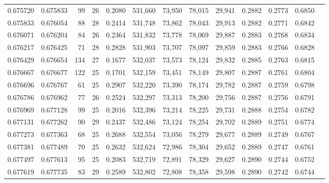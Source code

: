 \begin{tabular}{rrrrrrrrrrrrr}
0.675720 & 0.675833 &     99 &    26 &                                     0.2080 & 531,660 &  73,950 &  78,015 &  29,941 & 0.2882 & 0.2773 & 0.6850 \\
0.675833 & 0.676054 &     88 &    28 &                                     0.2414 & 531,748 &  73,862 &  78,043 &  29,913 & 0.2882 & 0.2771 & 0.6842 \\
0.676071 & 0.676204 &     84 &    26 &                                     0.2364 & 531,832 &  73,778 &  78,069 &  29,887 & 0.2883 & 0.2768 & 0.6834 \\
0.676217 & 0.676425 &     71 &    28 &                                     0.2828 & 531,903 &  73,707 &  78,097 &  29,859 & 0.2883 & 0.2766 & 0.6828 \\
0.676429 & 0.676654 &    134 &    27 &                                     0.1677 & 532,037 &  73,573 &  78,124 &  29,832 & 0.2885 & 0.2763 & 0.6815 \\
0.676667 & 0.676677 &    122 &    25 &                                     0.1701 & 532,159 &  73,451 &  78,149 &  29,807 & 0.2887 & 0.2761 & 0.6804 \\
0.676696 & 0.676767 &     61 &    25 &                                     0.2907 & 532,220 &  73,390 &  78,174 &  29,782 & 0.2887 & 0.2759 & 0.6798 \\
0.676786 & 0.676962 &     77 &    26 &                                     0.2524 & 532,297 &  73,313 &  78,200 &  29,756 & 0.2887 & 0.2756 & 0.6791 \\
0.676969 & 0.677128 &     99 &    25 &                                     0.2016 & 532,396 &  73,214 &  78,225 &  29,731 & 0.2888 & 0.2754 & 0.6782 \\
0.677131 & 0.677262 &     90 &    29 &                                     0.2437 & 532,486 &  73,124 &  78,254 &  29,702 & 0.2889 & 0.2751 & 0.6774 \\
0.677273 & 0.677363 &     68 &    25 &                                     0.2688 & 532,554 &  73,056 &  78,279 &  29,677 & 0.2889 & 0.2749 & 0.6767 \\
0.677381 & 0.677489 &     70 &    25 &                                     0.2632 & 532,624 &  72,986 &  78,304 &  29,652 & 0.2889 & 0.2747 & 0.6761 \\
0.677497 & 0.677613 &     95 &    25 &                                     0.2083 & 532,719 &  72,891 &  78,329 &  29,627 & 0.2890 & 0.2744 & 0.6752 \\
0.677619 & 0.677735 &     83 &    29 &                                     0.2589 & 532,802 &  72,808 &  78,358 &  29,598 & 0.2890 & 0.2742 & 0.6744 \\

\end{tabular}

